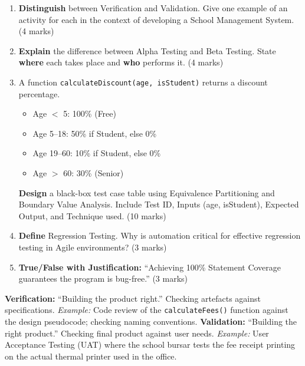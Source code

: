 \documentclass[11pt]{article}
\begin{document}
\begin{exercice}
\begin{enumerate}
    \item \textbf{Distinguish} between Verification and Validation. Give one example of an activity for each in the context of developing a School Management System. (4 marks)
    \item \textbf{Explain} the difference between Alpha Testing and Beta Testing. State \textbf{where} each takes place and \textbf{who} performs it. (4 marks)
    \item A function \texttt{calculateDiscount(age, isStudent)} returns a discount percentage.
        \begin{itemize}
            \item Age $<$ 5: 100\% (Free)
            \item Age 5--18: 50\% if Student, else 0\%
            \item Age 19--60: 10\% if Student, else 0\%
            \item Age $>$ 60: 30\% (Senior)
        \end{itemize}
        \textbf{Design} a black-box test case table using Equivalence Partitioning and Boundary Value Analysis. Include Test ID, Inputs (age, isStudent), Expected Output, and Technique used. (10 marks)
    \item \textbf{Define} Regression Testing. Why is automation critical for effective regression testing in Agile environments? (3 marks)
    \item \textbf{True/False with Justification:} ``Achieving 100\% Statement Coverage guarantees the program is bug-free.'' (3 marks)
\end{enumerate}
\end{exercice}

\begin{corrige}[Exercise 1]
\textbf{Verification:} ``Building the product right.'' Checking artefacts against specifications. \emph{Example:} Code review of the \texttt{calculateFees()} function against the design pseudocode; checking naming conventions.
\textbf{Validation:} ``Building the right product.'' Checking final product against user needs. \emph{Example:} User Acceptance Testing (UAT) where the school bursar tests the fee receipt printing on the actual thermal printer used in the office.
\end{corrige}
\end{document}
